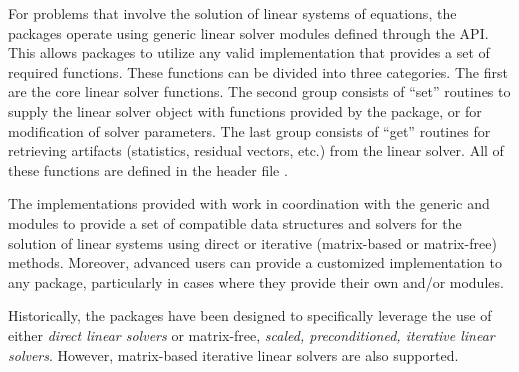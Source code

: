 %
For problems that involve the solution of linear systems of equations,
the {\sundials} packages operate using generic linear solver modules
defined through the {\sunlinsol} API.  This allows {\sundials}
packages to utilize any valid {\sunlinsol} implementation that provides
a set of required functions.  These functions can be divided into
three categories.  The first are the core linear solver functions.  The
second group consists of ``set'' routines to supply the linear solver object
with functions provided by the {\sundials} package, or for modification
of solver parameters.  The last group consists of ``get'' routines for
retrieving artifacts (statistics, residual vectors, etc.) from the
linear solver.  All of these functions are defined in the header file
.

The implementations provided with {\sundials} work in coordination
with the {\sundials} generic {\nvector} and {\sunmatrix} modules to
provide a set of compatible data structures and solvers for the
solution of linear systems using direct or iterative (matrix-based or matrix-free)
methods.  Moreover, advanced users can provide a customized
 implementation to any {\sundials} package,
particularly in cases where they provide their own {\nvector} and/or
{\sunmatrix} modules.

Historically, the {\sundials} packages have been designed to specifically
leverage the use of either \emph{direct linear solvers} or matrix-free,
\emph{scaled, preconditioned, iterative linear solvers}.  However,
matrix-based iterative linear solvers are also supported.

